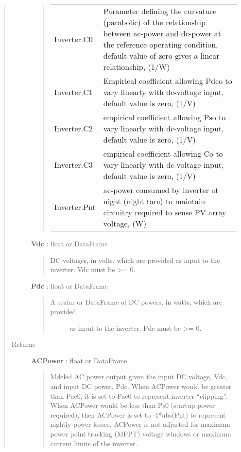 \documentclass[letterpaper,10pt,english]{sphinxmanual}
\begin{document}
\begin{fulllineitems}
\begin{quote}
\begin{description}
\begin{quote}
\begin{tabulary}{\linewidth}{|L|L|}
Inverter.C0
 & 
Parameter defining the curvature (parabolic) of the relationship between ac-power and dc-power at the reference operating condition, default value of zero gives a linear relationship, (1/W)
\\

Inverter.C1
 & 
Empirical coefficient allowing Pdco to vary linearly with dc-voltage input, default value is zero, (1/V)
\\

Inverter.C2
 & 
empirical coefficient allowing Pso to vary linearly with dc-voltage input, default value is zero, (1/V)
\\

Inverter.C3
 & 
empirical coefficient allowing Co to vary linearly with dc-voltage input, default value is zero, (1/V)
\\

Inverter.Pnt
 & 
ac-power consumed by inverter at night (night tare) to maintain circuitry required to sense PV array voltage, (W)
\\
\hline\end{tabulary}

\end{quote}

\textbf{Vdc} : float or DataFrame
\begin{quote}

DC voltages, in volts, which are provided as input to the inverter. Vdc must be \textgreater{}= 0.
\end{quote}

\textbf{Pdc} : float or DataFrame
\begin{quote}
\begin{description}
\item[{A scalar or DataFrame of DC powers, in watts, which are provided}] \leavevmode
as input to the inverter. Pdc must be \textgreater{}= 0.

\end{description}
\end{quote}

\item[{Returns}] \leavevmode
\textbf{ACPower} : float or DataFrame
\begin{quote}

Mdeled AC power output given the input 
DC voltage, Vdc, and input DC power, Pdc. When ACPower would be 
greater than Pac0, it is set to Pac0 to represent inverter 
``clipping''. When ACPower would be less than Ps0 (startup power
required), then ACPower is set to -1*abs(Pnt) to represent nightly 
power losses. ACPower is not adjusted for maximum power point
tracking (MPPT) voltage windows or maximum current limits of the
inverter.
\end{quote}


\end{description}
\end{quote}
\end{fulllineitems}
\end{document}
